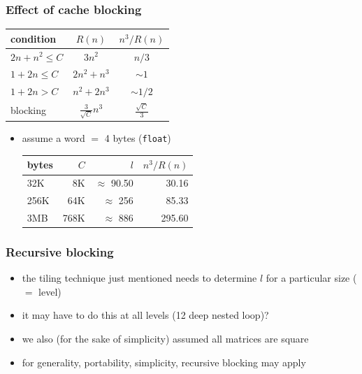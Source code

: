 \documentclass[12pt,dvipdfmx]{beamer}
\newcommand{\ao}[1]{{\color{blue}#1}}
\begin{document}
\begin{frame}[fragile]
\frametitle{Effect of cache blocking}

\begin{center}
\begin{tabular}{|l|c|c|}\hline
condition         & $R(n)$       & $n^3/R(n)$  \\\hline
$2n + n^2 \leq C$ & $3n^2$       & $n/3$       \\\hline
$1 + 2n \leq C$   & $2n^2 + n^3$ & $\sim 1$    \\ \hline
$1 + 2n > C$      & $n^2 + 2n^3$ & $\sim 1/2$   \\\hline
blocking          & ${\displaystyle \frac{3}{\sqrt{C}}} n^3$ & ${\displaystyle \frac{\sqrt{C}}{3}}$ \\\hline
\end{tabular}
\end{center}

\begin{itemize}
\item assume a word $=$ 4 bytes ({\tt float})
\begin{center}
  \begin{tabular}{|l|r|r|r|}\hline
bytes & $C$ & $l$ & $n^3/R(n)$ \\\hline
32K   & 8K  & $\approx$ 90.50  & \ao{30.16}  \\
256K  & 64K & $\approx$ 256 & \ao{85.33}  \\
3MB   & 768K & $\approx$ 886 & \ao{295.60} \\\hline
\end{tabular}
\end{center}
\end{itemize}
\end{frame}


\begin{frame}
\frametitle{Recursive blocking}
\begin{itemize}
\item the tiling technique just mentioned needs to determine $l$ 
  for a particular size ($=$ level)
\item it may have to do this at all levels (12 deep nested loop)?
\item we also (for the sake of simplicity) assumed all matrices are square
\item for generality, portability, simplicity, \ao{recursive blocking} may apply
\end{itemize}

\end{frame}
\end{document}
